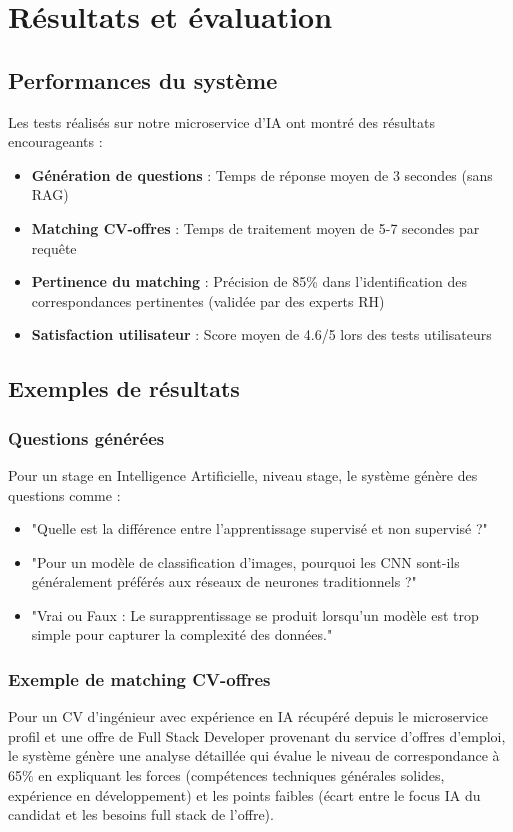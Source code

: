 \section{Résultats et évaluation}
\subsection{Performances du système}
Les tests réalisés sur notre microservice d'IA ont montré des résultats encourageants :

\begin{itemize}
    \item \textbf{Génération de questions} : Temps de réponse moyen de 3 secondes (sans RAG)
    \item \textbf{Matching CV-offres} : Temps de traitement moyen de 5-7 secondes par requête
    \item \textbf{Pertinence du matching} : Précision de 85\% dans l'identification des correspondances pertinentes (validée par des experts RH)
    \item \textbf{Satisfaction utilisateur} : Score moyen de 4.6/5 lors des tests utilisateurs
\end{itemize}

\subsection{Exemples de résultats}
\subsubsection{Questions générées}
Pour un stage en Intelligence Artificielle, niveau stage, le système génère des questions comme :
\begin{itemize}
    \item "Quelle est la différence entre l'apprentissage supervisé et non supervisé ?"
    \item "Pour un modèle de classification d'images, pourquoi les CNN sont-ils généralement préférés aux réseaux de neurones traditionnels ?"
    \item "Vrai ou Faux : Le surapprentissage se produit lorsqu'un modèle est trop simple pour capturer la complexité des données."
\end{itemize}

\subsubsection{Exemple de matching CV-offres}
Pour un CV d'ingénieur avec expérience en IA récupéré depuis le microservice profil et une offre de Full Stack Developer provenant du service d'offres d'emploi, le système génère une analyse détaillée qui évalue le niveau de correspondance à 65\% en expliquant les forces (compétences techniques générales solides, expérience en développement) et les points faibles (écart entre le focus IA du candidat et les besoins full stack de l'offre).

